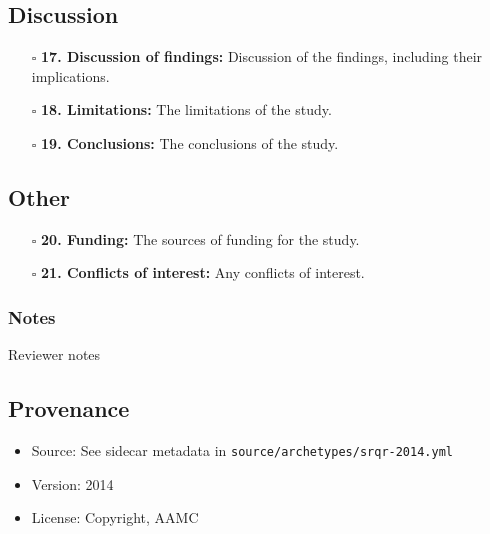 \documentclass[11pt]{article}
\def\tightlist{}
\begin{document}
\begin{Form}
\subsection{Discussion}\label{discussion}

\begin{itemize}
\tightlist
\item[$\square$]
  \textbf{17. Discussion of findings:} Discussion of the findings,
  including their implications.
\item[$\square$]
  \textbf{18. Limitations:} The limitations of the study.
\item[$\square$]
  \textbf{19. Conclusions:} The conclusions of the study.
\end{itemize}

\subsection{Other}\label{other}

\begin{itemize}
\tightlist
\item[$\square$]
  \textbf{20. Funding:} The sources of funding for the study.
\item[$\square$]
  \textbf{21. Conflicts of interest:} Any conflicts of interest.
\end{itemize}

\subsubsection{Notes}\label{notes}

{Reviewer notes}

\subsection{Provenance}\label{provenance}

\begin{itemize}
\tightlist
\item
  Source: See sidecar metadata in
  \texttt{source/archetypes/srqr-2014.yml}
\item
  Version: 2014
\item
  License: Copyright, AAMC
\end{itemize}

\end{Form}
\end{document}
